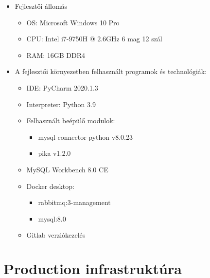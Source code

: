 \documentclass[12pt]{report}
\begin{document}
\begin{itemize}
    \item Fejlesztői állomás
    \begin{itemize}
	   \item OS:  Microsoft Windows 10 Pro
	   \item CPU: Intel i7-9750H @ 2.6GHz 6 mag 12 szál
	   \item RAM: 16GB DDR4
    \end{itemize}
	
    \item A fejlesztői környezetben felhasznált programok és technológiák:
    \begin{itemize}
        \item IDE: PyCharm 2020.1.3
        \item Interpreter: Python 3.9
        \item Felhasznált beépülő modulok:
        \begin{itemize}
            \item mysql-connector-python v8.0.23
            \item pika v1.2.0
        \end{itemize}
		\item MySQL Workbench 8.0 CE
		\item Docker desktop:
            \begin{itemize}
                \item rabbitmq:3-management
                \item mysql:8.0
            \end{itemize}
		\item Gitlab verziókezelés
    \end{itemize}
\end{itemize}

\newpage
\section{Production infrastruktúra}
\end{document}
